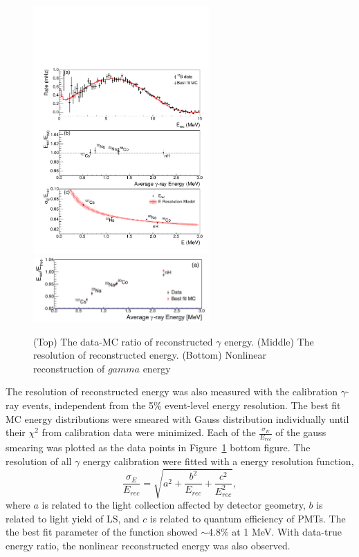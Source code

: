 \documentclass{article}
\begin{document}
\begin{figure}[h!]
\centering
\includegraphics[trim = 0cm 0cm 0cm 7.2cm, clip,width=0.6\textwidth]{SpectPRLEScalePlot1.pdf}
\includegraphics[width=0.6\textwidth]{nonlinear.pdf}
\caption{
(Top) The data-MC ratio of reconstructed $\gamma$ energy.
(Middle) The resolution of reconstructed energy.
(Bottom) Nonlinear reconstruction of $gamma$ energy}
\label{fig:eresolution}
\end{figure}

The resolution of reconstructed energy was also measured with the calibration $\gamma$-ray events, independent from the 5\% event-level energy resolution.
The best fit MC energy distributions were smeared with Gauss distribution individually until their $\chi^2$ from calibration data were minimized.
Each of the $\frac{\sigma_E}{E_{rec}}$ of the gauss smearing was plotted as the data points in Figure~\ref{fig:eresolution} bottom figure.
The resolution of all $\gamma$ energy calibration were fitted with a energy resolution function, 
\begin{equation}
    \frac{\sigma_E}{E_{rec}} = \sqrt{a^2+\frac{b^2}{E_{rec}}+\frac{c^2}{E^2_{rec}}},
\end{equation}
where $a$ is related to the light collection affected by detector geometry, $b$ is related to light yield of LS, and $c$ is related to quantum efficiency of PMTs.
The the best fit parameter of the function showed $\sim$4.8\% at 1 MeV.
With data-true energy ratio, the nonlinear reconstructed energy was also observed.
\end{document}
